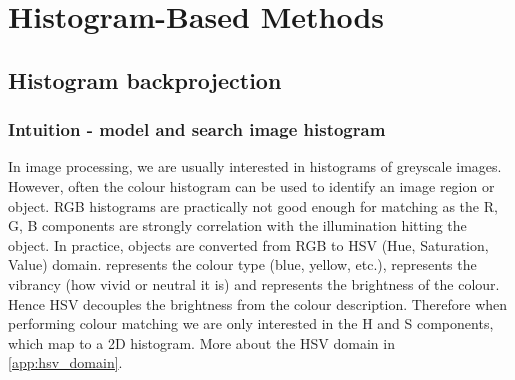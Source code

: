 \documentclass[a4paper]{article}
\begin{document}






\newpage
\tableofcontents
\newpage

\section{Histogram-Based Methods}

\subsection{Histogram backprojection}

\subsubsection{Intuition - model and search image histogram}
In image processing, we are usually interested in histograms of greyscale images. However, often the colour histogram can be used to identify an image region or object. RGB histograms are practically not good enough for matching as the R, G, B components are strongly correlation with the illumination hitting the object. In practice, objects are converted from RGB to HSV (Hue, Saturation, Value) domain.  represents the colour type (blue, yellow, etc.),  represents the vibrancy (how vivid or neutral it is) and  represents the brightness of the colour. Hence HSV decouples the brightness from the colour description. Therefore when performing colour matching we are only interested in the H and S components, which map to a 2D histogram. More about the HSV domain in \ref{app:hsv_domain}.
\end{document}
